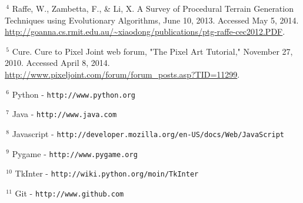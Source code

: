 \documentclass{article}
\begin{document}
\vspace{.3em}

\noindent
\hangindent=1cm
$\,^4$
Raffe, W., Zambetta, F., \& Li, X. A Survey of Procedural Terrain Generation Techniques using Evolutionary Algorithms, June 10, 2013. Accessed May 5, 2014. \url{http://goanna.cs.rmit.edu.au/~xiaodong/publications/ptg-raffe-cec2012.PDF}.

\vspace{.3em}

\noindent
\hangindent=1cm
$\,^5$
Cure. Cure to Pixel Joint web forum, "The Pixel Art Tutorial," November 27, 2010. Accessed April 8, 2014. \url{http://www.pixeljoint.com/forum/forum_posts.asp?TID=11299}. 

\vspace{.3em}

\noindent
$\,^6$
Python - {\tt http://www.python.org}

\vspace{.3em}

\noindent
$\,^7$
Java - {\tt http://www.java.com}

\vspace{.3em}

\noindent
$\,^8$
Javascript - {\tt http://developer.mozilla.org/en-US/docs/Web/JavaScript}

\vspace{.3em}

\noindent
$\,^9$
Pygame - {\tt http://www.pygame.org}

\vspace{.3em}

\noindent
$\,^{10}$
TkInter - {\tt http://wiki.python.org/moin/TkInter}

\vspace{.3em}

\noindent
$\,^{11}$
Git - {\tt http://www.github.com}

\vspace{.3em}
\end{document}
